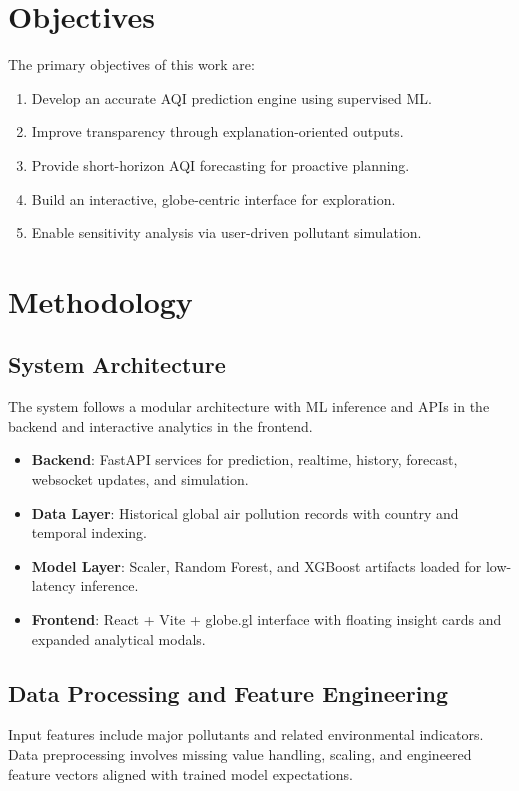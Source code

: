 \documentclass[12pt,a4paper]{article}
\begin{document}
\section{Objectives}
The primary objectives of this work are:
\begin{enumerate}[leftmargin=*]
    \item Develop an accurate AQI prediction engine using supervised ML.
    \item Improve transparency through explanation-oriented outputs.
    \item Provide short-horizon AQI forecasting for proactive planning.
    \item Build an interactive, globe-centric interface for exploration.
    \item Enable sensitivity analysis via user-driven pollutant simulation.
\end{enumerate}

\section{Methodology}
\subsection{System Architecture}
The system follows a modular architecture with ML inference and APIs in the backend and interactive analytics in the frontend.

\begin{itemize}[leftmargin=*]
    \item \textbf{Backend}: FastAPI services for prediction, realtime, history, forecast, websocket updates, and simulation.
    \item \textbf{Data Layer}: Historical global air pollution records with country and temporal indexing.
    \item \textbf{Model Layer}: Scaler, Random Forest, and XGBoost artifacts loaded for low-latency inference.
    \item \textbf{Frontend}: React + Vite + globe.gl interface with floating insight cards and expanded analytical modals.
\end{itemize}

\subsection{Data Processing and Feature Engineering}
Input features include major pollutants and related environmental indicators. Data preprocessing involves missing value handling, scaling, and engineered feature vectors aligned with trained model expectations.
\end{document}

